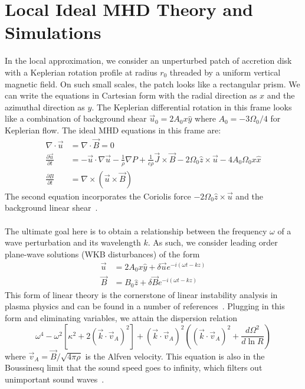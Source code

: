 \section{Local Ideal MHD Theory and Simulations} \label{sec:localideal}
In the local approximation, we consider an unperturbed patch of accretion disk with a Keplerian rotation profile at radius $r_0$ threaded by a uniform vertical magnetic field. On such small scales, the patch looks like a rectangular prism. We can write the equations in Cartesian form with the radial direction as $x$ and the azimuthal direction as $y$. The Keplerian differential rotation in this frame looks like a combination of background shear $\vec u_0=2A_0x\hat y$ where $A_0=-3\Omega_0/4$ for Keplerian flow. The ideal MHD equations in this frame are:
\begin{align}
  \nabla\cdot\vec u&=\nabla\cdot\vec B=0\\
  \frac{\partial\vec u}{\partial t}&=-\vec u\cdot\nabla\vec u-\frac1\rho\nabla P+\frac{1}{c\rho}\vec J\times\vec B-2\Omega_0\hat z\times\vec u-4A_0\Omega_0x\hat x\\
  \frac{\partial B}{\partial t}&=\nabla\times\left(\vec u\times\vec B\right)
\end{align}
The second equation incorporates the Coriolis force $-2\Omega_0\hat z\times\vec u$ and the background linear shear~\cite{AST521HW4}. \\
\\
The ultimate goal here is to obtain a relationship between the frequency $\omega$ of a wave perturbation and its wavelength $k$. As such, we consider leading order plane-wave solutions (WKB disturbances) of the form
\begin{align}
  \vec u&=2A_0x\hat y+\delta\vec ue^{-i(\omega t-kz)}\\
  \vec B&=B_0\hat z+\delta\vec Be^{-i(\omega t-kz)}
\end{align}
This form of linear theory is the cornerstone of linear instability analysis in plasma physics and can be found in a number of references~\cite{AST521HW4,BH1998,BH1991a,BH1991b,BH1991c,Quataert2008}. Plugging in this form and eliminating variables, we attain the dispersion relation
\begin{equation}
  \omega^4-\omega^2[\kappa^2+2(\vec k\cdot \vec v_A)^2]+(\vec k\cdot\vec v_A)^2\left((\vec k\cdot \vec v_A)^2+\frac{d\Omega^2}{d\ln R}\right)\label{eq:idealdispersion}
\end{equation}
where $\vec v_A=\vec B/\sqrt{4\pi\rho}$ is the Alfven velocity. This equation is also in the Boussinesq limit that the sound speed goes to infinity, which filters out unimportant sound waves~\cite{BH1998,KunzBoussinesq}. 

